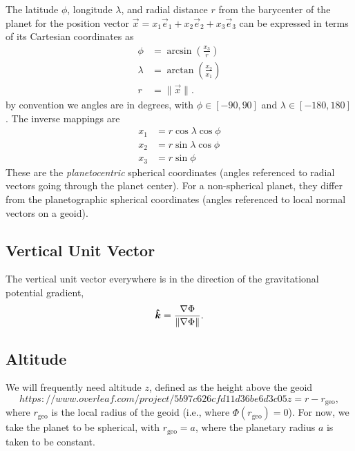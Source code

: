 \documentclass{report}
\begin{document}
The latitude $\phi$, longitude $\lambda$, and radial distance $r$ from the barycenter of the planet for the position vector $\vec{x} = x_1 \vec{e}_1 + x_2 \vec{e}_2 + x_3 \vec{e}_3$ can be expressed in terms of its Cartesian coordinates as
\begin{subequations}
\begin{align}
\phi     &= \arcsin\left(\frac{x_3}{r}\right) \\
\lambda  &= \arctan\left(\frac{x_2}{x_1}\right) \\
r        &= \|\vec{x}\|.
\end{align}
\end{subequations}
by convention we angles are in degrees, with $\phi \in [-90,90]$ and $\lambda \in [-180,180]$. The inverse mappings are
\begin{subequations}
\begin{align}
x_1 &= r \cos \lambda \cos \phi \\
x_2 &= r \sin \lambda \cos \phi \\
x_3 &= r \sin \phi
\end{align}
\end{subequations}
These are the \emph{planetocentric} spherical coordinates (angles referenced to radial vectors going through the planet center). For a non-spherical planet, they differ from the planetographic spherical coordinates (angles referenced to local normal vectors on a geoid).

\subsection{Vertical Unit Vector}

The vertical unit vector everywhere is in the direction of the gravitational potential gradient,
\begin{equation}\label{e:vert_unit_vector}
\boldsymbol{{\hat k}} = \frac{\nabla \Phi}{\|\nabla\Phi\|}.
\end{equation}

\subsection{Altitude}

We will frequently need altitude $z$, defined as the height above the geoid 
\begin{equation}https://www.overleaf.com/project/5b97c626cfd11d36be6d3c05
z=r-r_{\mathrm{geo}}, 
\end{equation}
where  $r_{\mathrm{geo}}$ is the local radius of the geoid (i.e., where $\Phi(r_{\mathrm{geo}})=0$). For now, we take the planet to be spherical, with $r_{\mathrm{geo}} = a$, where the planetary radius $a$ is taken to be constant.
\end{document}
